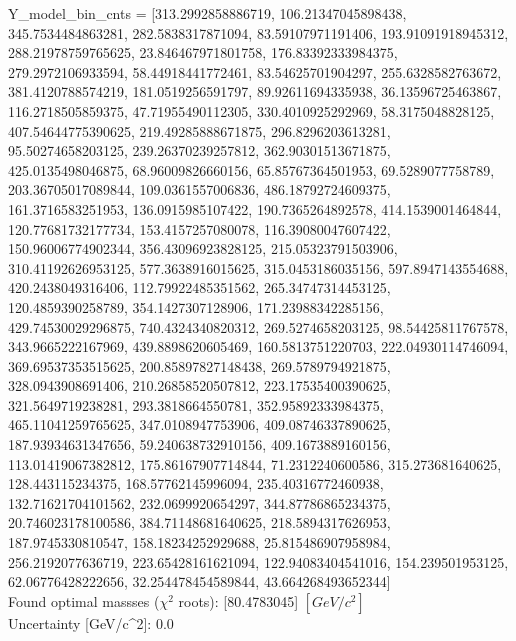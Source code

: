 \documentclass[12pt]{article}
\begin{document}
	Y\_model\_bin\_cnts = [313.2992858886719, 106.21347045898438, 345.7534484863281, 282.5838317871094, 83.59107971191406, 193.91091918945312, 288.21978759765625, 23.846467971801758, 176.83392333984375, 279.2972106933594, 58.44918441772461, 83.54625701904297, 255.6328582763672, 381.4120788574219, 181.0519256591797, 89.92611694335938, 36.13596725463867, 116.2718505859375, 47.71955490112305, 330.4010925292969, 58.3175048828125, 407.54644775390625, 219.49285888671875, 296.8296203613281, 95.50274658203125, 239.26370239257812, 362.90301513671875, 425.0135498046875, 68.96009826660156, 65.85767364501953, 69.5289077758789, 203.36705017089844, 109.0361557006836, 486.18792724609375, 161.3716583251953, 136.0915985107422, 190.7365264892578, 414.1539001464844, 120.77681732177734, 153.4157257080078, 116.39080047607422, 150.96006774902344, 356.43096923828125, 215.05323791503906, 310.41192626953125, 577.3638916015625, 315.0453186035156, 597.8947143554688, 420.2438049316406, 112.79922485351562, 265.34747314453125, 120.4859390258789, 354.1427307128906, 171.23988342285156, 429.74530029296875, 740.4324340820312, 269.5274658203125, 98.54425811767578, 343.9665222167969, 439.8898620605469, 160.5813751220703, 222.04930114746094, 369.69537353515625, 200.85897827148438, 269.5789794921875, 328.0943908691406, 210.26858520507812, 223.17535400390625, 321.5649719238281, 293.3818664550781, 352.95892333984375, 465.11041259765625, 347.0108947753906, 409.08746337890625, 187.93934631347656, 59.240638732910156, 409.1673889160156, 113.01419067382812, 175.86167907714844, 71.2312240600586, 315.273681640625, 128.443115234375, 168.57762145996094, 235.40316772460938, 132.71621704101562, 232.0699920654297, 344.87786865234375, 20.746023178100586, 384.71148681640625, 218.5894317626953, 187.9745330810547, 158.18234252929688, 25.815486907958984, 256.2192077636719, 223.65428161621094, 122.94083404541016, 154.239501953125, 62.06776428222656, 32.254478454589844, 43.664268493652344]\\

    Found optimal massses ($\chi^2$ roots): [80.4783045] $[GeV/c^{2}]$\\
    Uncertainty [GeV/c^2]: 0.0\\
\end{document}
